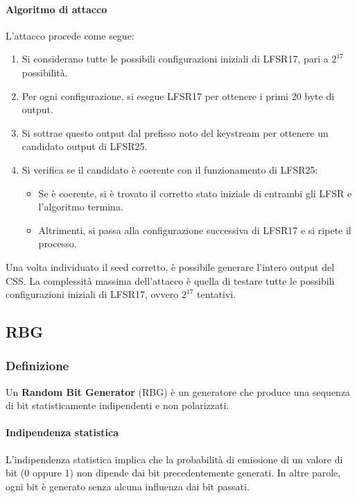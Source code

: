 \documentclass{report}
\begin{document}
\paragraph{Algoritmo di attacco}
L'attacco procede come segue:
\begin{enumerate}
    \item Si considerano tutte le possibili configurazioni iniziali di LFSR17, pari a $2^{17}$ possibilità.
    \item Per ogni configurazione, si esegue LFSR17 per ottenere i primi 20 byte di output.
    \item Si sottrae questo output dal prefisso noto del keystream per ottenere un candidato output di LFSR25.
    \item Si verifica se il candidato è coerente con il funzionamento di LFSR25:
    \begin{itemize}
        \item Se è coerente, si è trovato il corretto stato iniziale di entrambi gli LFSR e l'algoritmo termina.
        \item Altrimenti, si passa alla configurazione successiva di LFSR17 e si ripete il processo.
    \end{itemize}
\end{enumerate}
Una volta individuato il seed corretto, è possibile generare l'intero output del CSS. La complessità massima dell'attacco è quella di testare tutte le possibili configurazioni iniziali di LFSR17, ovvero $2^{17}$ tentativi.


\subsection{RBG}
\subsubsection{Definizione}

Un \textbf{Random Bit Generator} (RBG) è un generatore che produce una sequenza di bit statisticamente indipendenti e non polarizzati.

\paragraph{Indipendenza statistica}
L'indipendenza statistica implica che la probabilità di emissione di un valore di bit (0 oppure 1) non dipende dai bit precedentemente generati. In altre parole, ogni bit è generato senza alcuna influenza dai bit passati.
\end{document}
